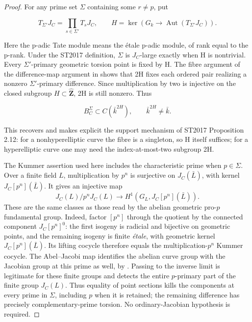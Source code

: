 \begin{proof}

For any prime set \({\Sigma}\) containing some \(r\ne p\), put

\[T_{\Sigma'}J_C=\prod_{s\in\Sigma'}T_sJ_C,\qquad H=\ker(G_k\to\operatorname{Aut}(T_{\Sigma'}J_C)).\]

Here the p-adic Tate module means the étale p-adic module, of rank equal to the p-rank. Under the ST2017 definition, \({\Sigma}\) is \(J_C\)-large exactly when H is nontrivial. Every \({\Sigma}'\)-primary geometric torsion point is fixed by H. The fibre argument of the difference-map argument in  shows that 2H fixes each ordered pair realizing a nonzero \({\Sigma}'\)-primary difference. Since multiplication by two is injective on the closed subgroup \(H{\subset}\widehat{\mathbf Z}\), 2H is still nonzero. Thus

\[B_C^\Sigma\subset C(\bar k^{2H}),\qquad \bar k^{2H}\ne\bar k.\]

This recovers and makes explicit the support mechanism of ST2017 Proposition 2.12: for a nonhyperelliptic curve the fibre is a singleton, so H itself suffices; for a hyperelliptic curve one may need the index-at-most-two subgroup 2H.

The Kummer assertion used here includes the characteristic prime when
$p\in\Sigma$. Over a finite field $L$, multiplication by $p^n$ is
surjective on $J_C(\bar L)$, with kernel $J_C[p^n](\bar L)$.
It gives an injective map
\[
 J_C(L)/p^nJ_C(L)\longrightarrow
 H^1(G_L,J_C[p^n](\bar L)).
\]
These are the same classes as those read by the abelian geometric
pro-$p$ fundamental group. Indeed, factor $[p^n]$ through the
quotient by the connected component $J_C[p^n]^0$: the first
isogeny is radicial and bijective on geometric points, and the
remaining isogeny is finite \emph{\'etale}, with geometric kernel
$J_C[p^n](\bar L)$. Its lifting cocycle therefore equals the
multiplication-$p^n$ Kummer cocycle. The Abel--Jacobi map identifies
the abelian curve group with the Jacobian group at this prime as
well, by \cite[Proposition 9.1]{MilneJac}. Passing to the inverse
limit is legitimate for these finite groups and detects the entire
$p$-primary part of the finite group $J_C(L)$. Thus equality of
point sections kills the components at every prime in $\Sigma$,
including $p$ when it is retained; the remaining difference has
precisely complementary-prime torsion. No ordinary-Jacobian
hypothesis is required.


\end{proof}
